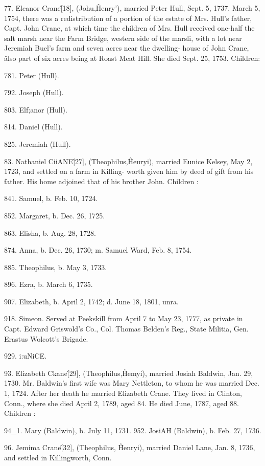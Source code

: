 \documentclass{book}
\begin{document}
77. Eleanor Crane\^ [18], (Johu,\^ Henry'), married Peter 
Hull, Sept. 5, 1737. March 5, 1754, there was a redistribution 
of a portion of the estate of Mrs. Hull's father, Capt. John Crane, 
at which time the children of Mrs. Hull received one-half the salt 
marsh near the Farm Bridge, western side of the marsli, with a 
lot near Jeremiah Buel's farm and seven acres near the dwelling- 
house of John Crane, \^ also part of six acres being at Roast Meat 
Hill. She died Sept. 25, 1753. Children: 

781. Peter (Hull). 

792. Joseph (Hull). 

803. Elf;anor (Hull). 

814. Daniel (Hull). 

825. Jeremiah (Hull). 




83. Nathaniel CiiANE\^ [27], (Theophilus,\^ Heuryi), married 
Eunice Kelsey, May 2, 1723, and settled on a farm in Killing- 
worth given him by deed of gift from his father. His home 
adjoined that of his brother John. Children : 

841. Samuel, b. Feb. 10, 1724. 

852. Margaret, b. Dec. 26, 1725. 

863. Elisha, b. Aug. 28, 1728. 

874. Anna, b. Dec. 26, 1730; m. Samuel Ward, Feb. 8, 1754. 

885. Theophilus, b. May 3, 1733. 

896. Ezra, b. March 6, 1735. 

907. Elizabeth, b. April 2, 1742; d. June 18, 1801, unra. 

918. Simeon. Served at Peekskill from April 7 to May 23, 1777, as 
private in Capt. Edward Griswold's Co., Col. Thomas 
Belden's Reg., State Militia, Gen. Erastus Wolcott's Brigade. 

929. i:uNiCE. 

93. Elizabeth Ckane\^ [29], (Theophilus,\^ Hemyi), married 
Josiah Baldwin, Jan. 29, 1730. Mr. Baldwin's first wife was 
Mary Nettleton, to whom he was married Dec. 1, 1724. After her 
death he married Elizabeth Crane. They lived in Clinton, Conn., 
where she died April 2, 1789, aged 84. He died June, 1787, 
aged 88. Children : 

94\_1. Mary (Baldwin), b. July 11, 1731. 
952. JosiAH (Baldwin), b. Feb. 27, 1736. 

96. Jemima Crane\^ [32], (Theophilus, \^ Henryi), married 
Daniel Lane, Jan. 8, 1736, and settled in Killingworth, Conn. 
\end{document}
